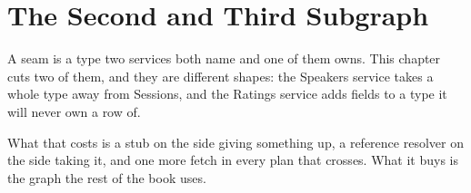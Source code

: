 \chapter{The Second and Third Subgraph}
\label{ch:second-third-subgraph}

A seam is a type two services both name and one of them owns. This chapter
cuts two of them, and they are different shapes: the Speakers service takes a
whole type away from Sessions, and the Ratings service adds fields to a type it
will never own a row of.

What that costs is a stub on the side giving something up, a reference resolver
on the side taking it, and one more fetch in every plan that crosses. What it
buys is the graph the rest of the book uses.










